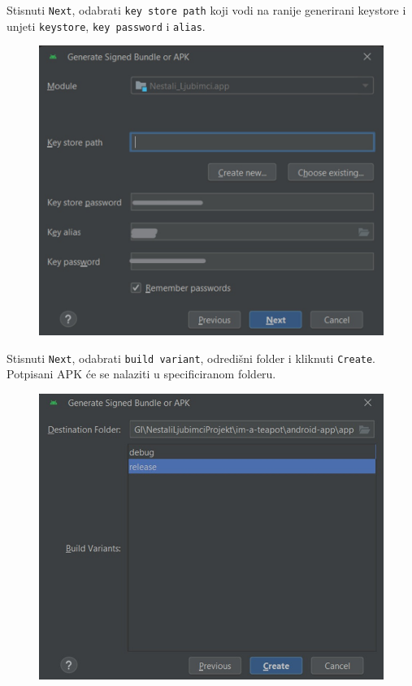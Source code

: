 		Stisnuti \texttt{Next}, odabrati \texttt{key store path} koji vodi na ranije generirani keystore i unjeti \texttt{keystore}, \texttt{key password} i \texttt{alias}.
		
		\begin{figure}[H]
			\includegraphics[scale=0.4]{slike/deploy5.jpg} %
			\centering
			\label{fig:deploy5}
		\end{figure}
		
		Stisnuti \texttt{Next}, odabrati \texttt{build variant}, odredišni folder i kliknuti \texttt{Create}. Potpisani APK će se nalaziti u specificiranom folderu.
		
		\begin{figure}[H]
			\includegraphics[scale=0.43]{slike/deploy6.jpg} %
			\centering
			\label{fig:deploy6}
		\end{figure}
		
